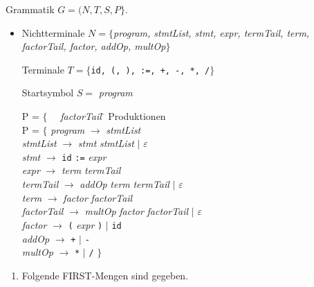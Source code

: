\documentclass{uebungsblatt}
\begin{document}


\begin{aufgabe}
\medskip 
Grammatik $G = (N, T, S, P\}$.

\begin{itemize}
\item[]
Nichtterminale
$N = \{$\textit{program, stmtList, stmt, expr, termTail, term, factorTail, factor, addOp, multOp}$\}$

Terminale $T = \{$\texttt{id, (, ), :=, +, -, *, /}$\}$

Startsymbol $S = $ \textit{program}

\begin{tabbing}
P = $\{\quad$ \= \textit{factorTail} \= \kill
Produktionen \\
P = $\{$ \> \textit{program}    \> $\rightarrow$ \textit{stmtList} \\
\> \textit{stmtList}   \> $\rightarrow$ \textit{stmt} \textit{stmtList} $|$ $\varepsilon$ \\
\> \textit{stmt}       \> $\rightarrow$ \texttt{id} \texttt{:=} \textit{expr} \\
\> \textit{expr}       \> $\rightarrow$ \textit{term} \textit{termTail} \\
\> \textit{termTail}   \> $\rightarrow$ \textit{addOp} \textit{term} \textit{termTail} $|$ $\varepsilon$ \\
\> \textit{term}       \> $\rightarrow$ \textit{factor} \textit{factorTail} \\
\> \textit{factorTail} \> $\rightarrow$ \textit{multOp} \textit{factor} \textit{factorTail} $|$ $\varepsilon$ \\
\> \textit{factor}     \> $\rightarrow$ \texttt{(} \textit{expr} \texttt{)} 
$|$ \texttt{id} \\
\> \textit{addOp}      \> $\rightarrow$ \texttt{+} $|$ \texttt{-} \\
\> \textit{multOp}     \> $\rightarrow$ \texttt{*} $|$ \texttt{/} \quad $\}$
\end{tabbing}
\end{itemize}

\begin{enumerate}
\item
Folgende FIRST-Mengen sind gegeben.


\end{enumerate}
\end{aufgabe}
\end{document}
